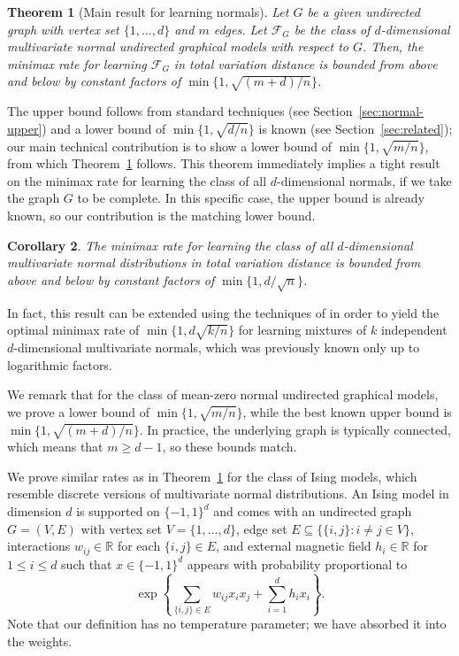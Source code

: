 \documentclass[letterpaper]{amsart}
\newcommand{\sF}{\mathcal{F}}
\newcommand{\R}{\mathbb{R}}
\let\originalleft\left
\let\originalright\right
\def\left#1{\mathopen{}\originalleft#1}
\def\right#1{\originalright#1\mathclose{}}
\newcommand{\secref}[1]{\mbox{Section~\ref{sec:#1}}}
\newtheorem{thm}{Theorem}{\bfseries}{\itshape}
\newcommand{\thmlabel}[1]{\label{thm:#1}}
\newcommand{\thmref}[1]{Theorem~\ref{thm:#1}}
\numberwithin{thm}{section}
\newtheorem{cor}[thm]{Corollary}{\bfseries}{\itshape}
\theoremstyle{definition}
\theoremstyle{plain}
\begin{document}
\begin{thm}[Main result for learning normals]\thmlabel{normal-main-bound}
  Let $G$ be a given undirected graph with vertex set
  $\{1, \dots, d\}$ and $m$ edges. Let $\sF_G$ be the class of
  $d$-dimensional multivariate normal undirected graphical models with
  respect to $G$. Then, the minimax rate for learning $\sF_{G}$ in
  total variation distance is bounded from above and below by constant
  factors of $\min\{1, \sqrt{(m + d)/n}\}$.
\end{thm}

The upper bound follows from standard techniques (see
\secref{normal-upper}) and a lower bound of $\min\{1, \sqrt{d/n}\}$ is
known (see Section~\ref{sec:related}); our main technical contribution
is to show a lower bound of $\min\{1, \sqrt{m/n}\}$, from which
\thmref{normal-main-bound} follows.  This theorem immediately implies
a tight result on the minimax rate for learning the class of all
$d$-dimensional normals, if we take the graph $G$ to be complete. In
this specific case, the upper bound is already known, so our
contribution is the matching lower bound.
\begin{cor}
  The minimax rate for learning the class of all $d$-dimensional
  multivariate normal distributions in total variation distance is
  bounded from above and below by constant factors of
  $\min\{1, d/\sqrt{n}\}$.
\end{cor}
In fact, this result can be extended using the techniques of
\cite{2017-abbas} in order to yield the optimal minimax rate of
$\min\{1, d\sqrt{k/n}\}$ for learning mixtures of $k$ independent
$d$-dimensional multivariate normals, which was previously known only
up to logarithmic factors.

We remark that for the class of mean-zero normal undirected graphical
models, we prove a lower bound of $\min\{1, \sqrt{m/n}\}$, while the
best known upper bound is $\min\{1, \sqrt{(m + d)/n}\}$. In practice,
the underlying graph is typically connected, which means that
$m \ge d - 1$, so these bounds match.

We prove similar rates as in \thmref{normal-main-bound} for the class
of Ising models, which resemble discrete versions of multivariate
normal distributions. An Ising model in dimension $d$ is supported on
$\{-1, 1\}^d$ and comes with an undirected graph $G = (V, E)$ with
vertex set $V = \{1, \dots, d\}$, edge set
$E \subseteq \{\{i, j\} \colon i \neq j \in V\}$, interactions
$w_{ij} \in \R$ for each $\{i, j\} \in E$, and external magnetic field
$h_i \in \R$ for $1 \le i \le d$ such that $x \in \{-1, 1\}^d$ appears
with probability proportional to
\[
   \exp\left\{\sum_{\{i, j\} \in E} w_{ij} x_i x_j + \sum_{i = 1}^d h_i x_i\right\} .
\]
Note that our definition has no temperature parameter; we have
absorbed it into the weights.
\end{document}
